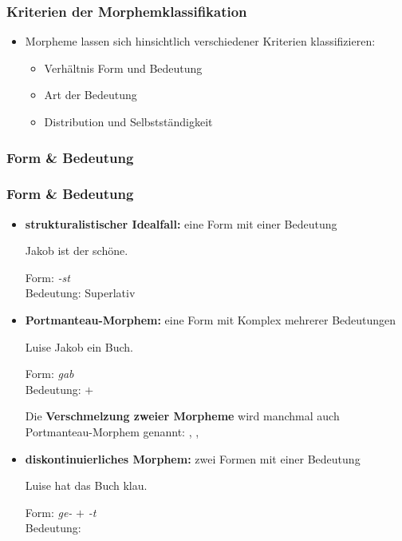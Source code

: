 \begin{frame}
\frametitle{Kriterien der Morphemklassifikation}

\begin{itemize}
	\item Morpheme lassen sich hinsichtlich verschiedener Kriterien klassifizieren:
	
	\begin{itemize}
	 \item Verhältnis Form und Bedeutung
	 \item Art der Bedeutung
	 \item Distribution und Selbstständigkeit
	\end{itemize}
\end{itemize}


\end{frame}



\subsubsection{Form \& Bedeutung}


\begin{frame}
\frametitle{Form \& Bedeutung}

\begin{itemize}
	\item \textbf{strukturalistischer Idealfall:} eine Form mit einer Bedeutung
	
	\ea	Jakob ist der schöne.
	
	Form: \emph{-st} \\
	Bedeutung: Superlativ
	\z

\pause 
	
	\item \textbf{Portmanteau-Morphem:}  eine Form mit Komplex mehrerer Bedeutungen
	
	\ea Luise  Jakob ein Buch.
	
	Form: \emph{gab} \\
	Bedeutung:  $+$ 
	\z
	
	Die \textbf{Verschmelzung zweier Morpheme} wird manchmal auch Portmanteau-Morphem genannt: , , 

\pause 
	
	\item \textbf{diskontinuierliches Morphem:} zwei Formen mit einer Bedeutung 
	
	\ea Luise hat das Buch klau.
	
	Form: \emph{ge-} $+$ \emph{-t} \\
	Bedeutung:  \\

	\z	

\end{itemize}

\end{frame}


